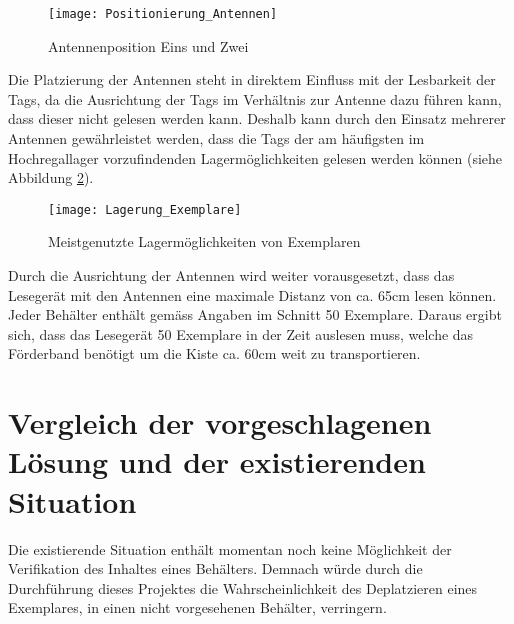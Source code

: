 \begin{figure}[htb]
	\centering
	\texttt{[image: Positionierung\_Antennen]}
	\caption{Antennenposition Eins und Zwei}
	\label{fig:positionAntennen}
\end{figure}

Die Platzierung der Antennen steht in direktem Einfluss mit der Lesbarkeit der Tags, da die Ausrichtung der Tags im Verhältnis zur Antenne dazu führen kann, dass dieser nicht gelesen werden kann. Deshalb kann durch den Einsatz mehrerer Antennen gewährleistet werden, dass die Tags der am häufigsten im Hochregallager vorzufindenden Lagermöglichkeiten gelesen werden können (siehe Abbildung \ref{fig:lagermöglichkeitExemplare}).

\begin{figure}[htb]
	\centering
	\texttt{[image: Lagerung\_Exemplare]}
	\caption{Meistgenutzte Lagermöglichkeiten von Exemplaren}
	\label{fig:lagermöglichkeitExemplare}
\end{figure}

Durch die Ausrichtung der Antennen wird weiter vorausgesetzt, dass das Lesegerät mit den Antennen eine maximale Distanz von ca. 65cm lesen können. Jeder Behälter enthält gemäss Angaben im Schnitt 50 Exemplare. Daraus ergibt sich, dass das Lesegerät 50 Exemplare in der Zeit auslesen muss, welche das Förderband benötigt um die Kiste ca. 60cm weit zu transportieren.

\section{Vergleich der vorgeschlagenen Lösung und der existierenden Situation}
Die existierende Situation enthält momentan noch keine Möglichkeit der Verifikation des Inhaltes eines Behälters. Demnach würde durch die Durchführung dieses Projektes die Wahrscheinlichkeit des Deplatzieren eines Exemplares, in einen nicht vorgesehenen Behälter, verringern.

